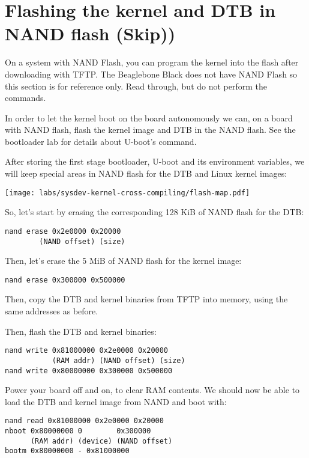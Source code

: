 \section{Flashing the kernel and DTB in NAND flash (Skip))}

On a system with NAND Flash, you can program the kernel into the flash
after downloading with TFTP. The Beaglebone Black does not have NAND Flash
so this section is for reference only. Read through, but do not perform the commands.

In order to let the kernel boot on the board autonomously we can,
on a board with NAND flash, flash the kernel image and DTB in the NAND flash. 
See the bootloader lab for details about U-boot's  command.

After storing the first stage bootloader, U-boot and its environment
variables, we will keep special areas in NAND flash for the DTB
and Linux kernel images:

\begin{center}
  \texttt{[image: labs/sysdev-kernel-cross-compiling/flash-map.pdf]}
\end{center}

So, let's start by erasing the corresponding 128 KiB of NAND flash
for the DTB:

\begin{verbatim}
nand erase 0x2e0000 0x20000
        (NAND offset) (size)
\end{verbatim}

Then, let's erase the 5 MiB of NAND flash for the kernel image:

\begin{verbatim}
nand erase 0x300000 0x500000
\end{verbatim}

Then, copy the DTB and kernel binaries from TFTP into memory, using the
same addresses as before.

Then, flash the DTB and kernel binaries:

\begin{verbatim}
nand write 0x81000000 0x2e0000 0x20000
           (RAM addr) (NAND offset) (size)
nand write 0x80000000 0x300000 0x500000
\end{verbatim}

Power your board off and on, to clear RAM contents. We should now be
able to load the DTB and kernel image from NAND and boot with:

\begin{verbatim}
nand read 0x81000000 0x2e0000 0x20000
nboot 0x80000000 0        0x300000
      (RAM addr) (device) (NAND offset)
bootm 0x80000000 - 0x81000000
\end{verbatim}

